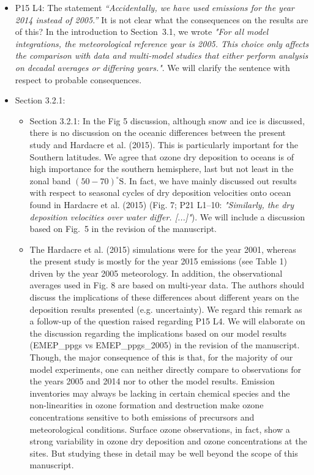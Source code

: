 \documentclass{scrartcl}
\begin{document}
\begin{itemize}
\item {\color{blue}  P15 L4: The statement \emph{“Accidentally, we have used emissions for the year
  2014 instead of 2005.”} It is not clear what the consequences on the results are of this?}
  In the introduction to Section~3.1, we wrote \emph{"For all model integrations, the meteorological reference year is 2005. This choice only affects the comparison with data and multi-model studies that either perform analysis on decadal averages or differing years."}. We will clarify the sentence with respect to probable consequences.
  \emph{}
  
\item {\color{blue}  Section 3.2.1: }
  \begin{itemize}
  \item {\color{blue}  Section 3.2.1: In the Fig 5 discussion, although snow and ice is discussed, there is
    no discussion on the oceanic differences between the present study and Hardacre et
    al. (2015). This is particularly important for the Southern latitudes.}
    We agree that ozone dry deposition to oceans is of high importance for the southern hemisphere, last but not least in the zonal band $(50-70)^\circ\mathrm{S}$. In fact, we have mainly discussed out results with respect to seasonal cycles of dry deposition velocities onto ocean found in Hardacre et al. (2015) (Fig. 7; P21 L1--10: \emph{"Similarly, the dry deposition velocities over water differ. [...]"}). We will include a discussion based on Fig.~5 in the revision of the manuscript.
    \emph{}
    
  \item {\color{blue}  The Hardacre et al. (2015) simulations were for the year 2001,
    whereas the present study is mostly for the year 2015 emissions (see Table 1) driven
    by the year 2005 meteorology. In addition, the observational averages used in Fig. 8
    are based on multi-year data. The authors should discuss the implications of these
    differences about different years on the deposition results presented (e.g. uncertainty).}
    We regard this remark as a follow-up of the question raised regarding P15 L4.
    We will elaborate on the discussion regarding the implications based on our model results (EMEP\_ppgs vs EMEP\_ppgs\_2005) in the revision of the manuscript. Though, the major consequence of this is that, for the majority of our model experiments, one can neither directly compare to observations for the years 2005 and 2014 nor to other the model results. Emission inventories may always be lacking in certain chemical species and the non-linearities in ozone formation and destruction make ozone concentrations sensitive to both emissions of precursors and meteorological conditions. Surface ozone observations, in fact, show a strong variability in ozone dry deposition and ozone concentrations at the sites. But studying these in detail may be well beyond the scope of this manuscript. 
    \emph{}
  \end{itemize}
  

\end{itemize}
\end{document}

